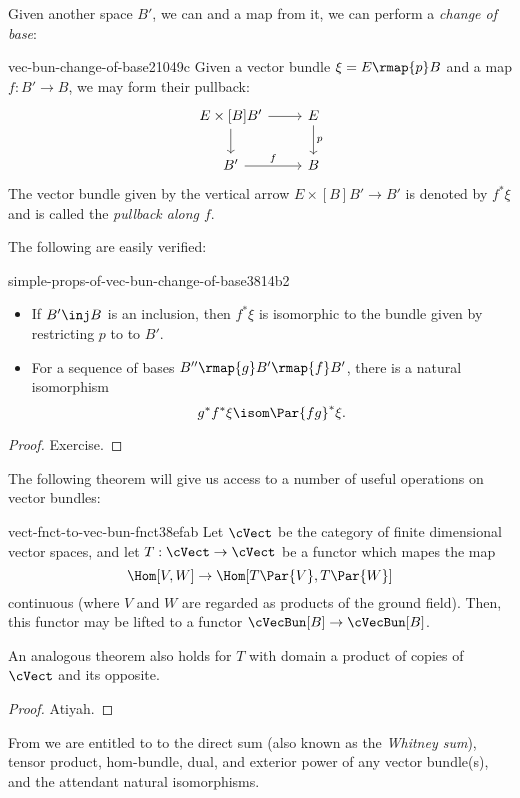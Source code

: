 Given another space $B'$, we can and a map from it, we can perform a
\emph{change of base}:
\begin{defn}{vec-bun-change-of-base}{21049c}
  Given a vector bundle $\xi = E \rmap{p} B$ and a map $f: B' \to B$, we may
  form their pullback:
  \[\begin{tikzcd}
    E \times[B] B' \ar{r}{} \ar{d}{} & \ar{d}{p} E \\
    B' \ar{r}{f} & B
  \end{tikzcd}\]
  The vector bundle given by the vertical arrow $E \times[B] B' \to B'$ is denoted
  by $f^*\xi$ and is called the \emph{pullback along $f$}.
\end{defn}

The following are easily verified:
\begin{prop}{simple-props-of-vec-bun-change-of-base}{3814b2}
  \hfill
  \begin{itemize}
    \item If $B' \inj B$ is an inclusion, then $f^*\xi$ is isomorphic
          to the bundle given by restricting $p$ to to $B'$.
    \item For a sequence of bases $B'' \rmap{g} B' \rmap{f} B'$, there is
          a natural isomorphism
          \[ g^* f^* \xi \isom \Par{fg}^* \xi. \] 
  \end{itemize}
\end{prop}
\begin{proof}
  Exercise. %
\end{proof}

The following theorem will give us access to a number of useful operations
on vector bundles:
\begin{thm}{vect-fnct-to-vec-bun-fnct}{38efab}
  Let $\cVect$ be the category of finite dimensional vector spaces, and
  let $T:\cVect \to \cVect$ be a functor which mapes the map
  \[ \Hom[V, W] \to \Hom[T\Par{V}, T\Par{W}] \]
  continuous (where $V$ and $W$ are regarded as products of the ground field).
  Then, this functor may be lifted to a functor $\cVecBun[B] \to \cVecBun[B]$.

  An analogous theorem also holds for $T$ with domain a product of copies of 
  $\cVect$ and its opposite.
\end{thm}
\begin{proof}
  Atiyah. \citeme
\end{proof}

From  we are entitled to to the direct sum 
(also known as the \emph{Whitney sum}), 
tensor product, hom-bundle, dual, and exterior power of
any vector bundle(s), and the attendant natural isomorphisms. 

